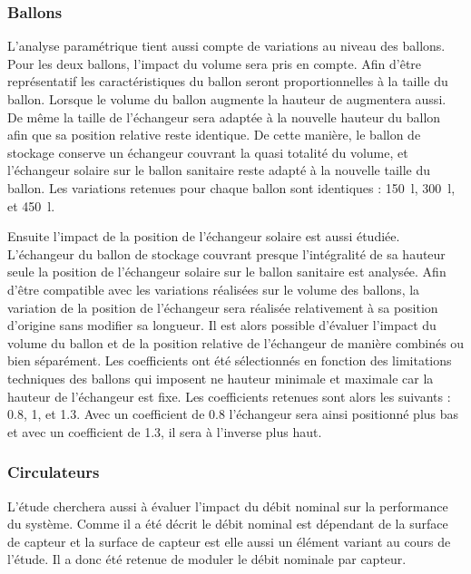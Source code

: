 \subsubsection{Ballons} %
\label{ssub:ballons}
L’analyse paramétrique tient aussi compte de variations au niveau des ballons.
Pour les deux ballons, l’impact du volume sera pris en compte. Afin d’être
représentatif les caractéristiques du ballon seront proportionnelles à la taille
du ballon. Lorsque le volume du ballon augmente la hauteur de augmentera aussi.
De même la taille de l’échangeur sera adaptée à la nouvelle hauteur du ballon
afin que sa position relative reste identique. De cette manière, le ballon de
stockage conserve un échangeur couvrant la quasi totalité du volume, et
l’échangeur solaire sur le ballon sanitaire reste adapté à la nouvelle taille du
ballon. Les variations retenues pour chaque ballon sont identiques :
\SI{150}{l}, \SI{300}{l}, et \SI{450}{l}.

Ensuite l’impact de la position de l’échangeur solaire est aussi étudiée. L’échangeur du
ballon de stockage couvrant presque l’intégralité de sa hauteur seule la position de
l’échangeur solaire sur le ballon sanitaire est analysée. Afin d’être compatible avec les
variations réalisées sur le volume des ballons, la variation de la position de l’échangeur
sera réalisée relativement à sa position d’origine sans modifier sa longueur. Il est alors
possible d’évaluer l’impact du volume du ballon et de la position relative de l’échangeur
de manière combinés ou bien séparément. Les coefficients ont été sélectionnés en fonction
des limitations techniques des ballons qui imposent ne hauteur minimale et maximale car la
hauteur de l’échangeur est fixe. Les coefficients retenues sont alors les suivants :
\num{0.8}, \num{1}, et \num{1.3}. Avec un coefficient de \num{0.8} l’échangeur sera ainsi
positionné plus bas et avec un coefficient de \num{1.3}, il sera à l’inverse plus haut.



\subsubsection{Circulateurs} %
\label{ssub:circulateurs}
L’étude cherchera aussi à évaluer l’impact du débit nominal sur la performance du
système. Comme il a été décrit le débit nominal est dépendant de la surface de capteur
et la surface de capteur est elle aussi un élément variant au cours de l’étude. Il a donc
été retenue de moduler le débit nominale par capteur.

